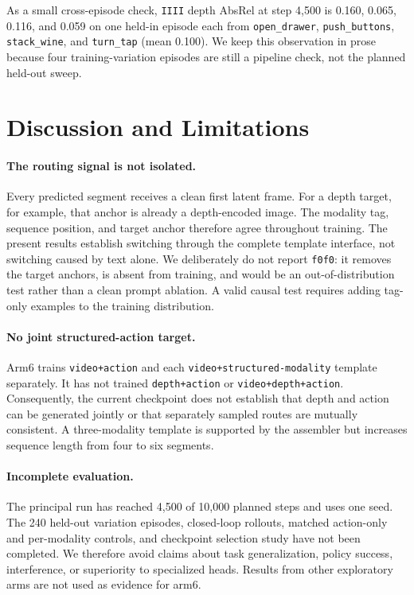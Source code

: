 \documentclass{article}
\newcommand{\code}[1]{\texttt{#1}}
\begin{document}
As a small cross-episode check, \code{IIII} depth AbsRel at step 4,500 is 0.160, 0.065, 0.116,
and 0.059 on one held-in episode each from \code{open\_drawer}, \code{push\_buttons},
\code{stack\_wine}, and \code{turn\_tap} (mean 0.100). We keep this observation in prose because
four training-variation episodes are still a pipeline check, not the planned held-out sweep.

\section{Discussion and Limitations}
\label{sec:limitations}

\paragraph{The routing signal is not isolated.}
Every predicted segment receives a clean first latent frame. For a depth target, for example,
that anchor is already a depth-encoded image. The modality tag, sequence position, and target
anchor therefore agree throughout training. The present results establish switching through the
complete template interface, not switching caused by text alone. We deliberately do not report
\code{f0f0}: it removes the target anchors, is absent from training, and would be an
out-of-distribution test rather than a clean prompt ablation. A valid causal test requires adding
tag-only examples to the training distribution.

\paragraph{No joint structured-action target.}
Arm6 trains \code{video+action} and each \code{video+structured-modality} template separately.
It has not trained \code{depth+action} or \code{video+depth+action}. Consequently, the current
checkpoint does not establish that depth and action can be generated jointly or that separately
sampled routes are mutually consistent. A three-modality template is supported by the assembler
but increases sequence length from four to six segments.

\paragraph{Incomplete evaluation.}
The principal run has reached 4,500 of 10,000 planned steps and uses one seed. The 240 held-out
variation episodes, closed-loop rollouts, matched action-only and per-modality controls, and
checkpoint selection study have not been completed. We therefore avoid claims about task
generalization, policy success, interference, or superiority to specialized heads. Results from
other exploratory arms are not used as evidence for arm6.
\end{document}
